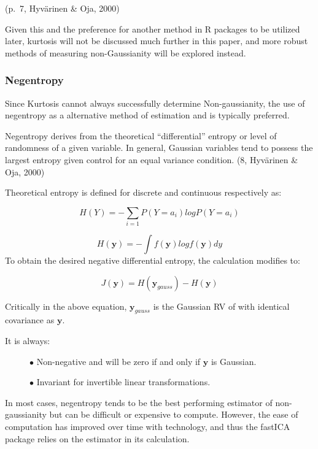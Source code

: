\documentclass[12pt,twoside]{amherstthesis}
\begin{document}
  (p.~7, Hyvärinen \& Oja, 2000) \newline
  
  Given this and the preference for another method in R packages to be
  utilized later, kurtosis will not be discussed much further in this
  paper, and more robust methods of measuring non-Gaussianity will be
  explored instead.
  
  \subsubsection{Negentropy}\label{negentropy}
  
  Since Kurtosis cannot always successfully determine Non-gaussianity, the
  use of negentropy as a alternative method of estimation and is typically
  preferred.
  
  Negentropy derives from the theoretical ``differential'' entropy or
  level of randomness of a given variable. In general, Gaussian variables
  tend to possess the largest entropy given control for an equal variance
  condition. (8, Hyvärinen \& Oja, 2000)
  
  Theoretical entropy is defined for discrete and continuous respectively
  as:
  
  \[H(Y) = -\sum_{i=1}P(Y = a_i)log P(Y = a_i)\]
  
  \[H(\textbf{y}) = -\int f(\textbf{y})logf(\textbf{y})dy\] To obtain the
  desired negative differential entropy, the calculation modifies to:
  
  \[ J(\textbf{y}) = H(\textbf{y}_{gauss}) -H(\textbf{y})\]
  
  Critically in the above equation, \(\textbf{y}_\textit{gauss}\) is the
  Gaussian RV of with identical covariance as \(\textbf{y}\).
  
  It is always:
  
  \begin{figure}[h]
  
  $\bullet$ Non-negative and will be zero if and only if $\textbf{y}$ is Gaussian. \newline
  
  
  
  $\bullet$ Invariant for invertible linear transformations.
  
  \end{figure}
  
  In most cases, negentropy tends to be the best performing estimator of
  non-gaussianity but can be difficult or expensive to compute. However,
  the ease of computation has improved over time with technology, and thus
  the fastICA package relies on the estimator in its calculation.
  
\end{document}
